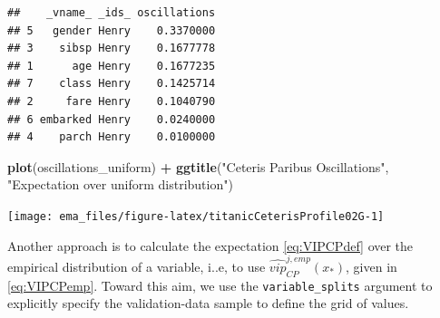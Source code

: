 \documentclass[12pt,]{krantz}
\newenvironment{Shaded}{\begin{snugshade}}{\end{snugshade}}
\newcommand{\DataTypeTok}[1]{\textcolor[rgb]{0.13,0.29,0.53}{#1}}
\newcommand{\KeywordTok}[1]{\textcolor[rgb]{0.13,0.29,0.53}{\textbf{#1}}}
\newcommand{\NormalTok}[1]{#1}
\newcommand{\OperatorTok}[1]{\textcolor[rgb]{0.81,0.36,0.00}{\textbf{#1}}}
\newcommand{\StringTok}[1]{\textcolor[rgb]{0.31,0.60,0.02}{#1}}
\begin{document}
\begin{verbatim}
##    _vname_ _ids_ oscillations
## 5   gender Henry    0.3370000
## 3    sibsp Henry    0.1677778
## 1      age Henry    0.1677235
## 7    class Henry    0.1425714
## 2     fare Henry    0.1040790
## 6 embarked Henry    0.0240000
## 4    parch Henry    0.0100000
\end{verbatim}

\begin{Shaded}
\begin{Highlighting}[]
\KeywordTok{plot}\NormalTok{(oscillations_uniform) }\OperatorTok{+}\StringTok{ }\KeywordTok{ggtitle}\NormalTok{(}\StringTok{"Ceteris Paribus Oscillations"}\NormalTok{, }\StringTok{"Expectation over uniform distribution"}\NormalTok{)}
\end{Highlighting}
\end{Shaded}

\begin{center}\texttt{[image: ema\_files/figure-latex/titanicCeterisProfile02G-1]} \end{center}

Another approach is to calculate the expectation \eqref{eq:VIPCPdef} over the empirical distribution of a variable, i..e, to use \(\widehat{vip}_{CP}^{j,emp}(x_*)\), given in \eqref{eq:VIPCPemp}. Toward this aim, we use the \texttt{variable\_splits} argument to explicitly specify the validation-data sample to define the grid of values.

\begin{Shaded}
\end{Shaded}
\end{document}

